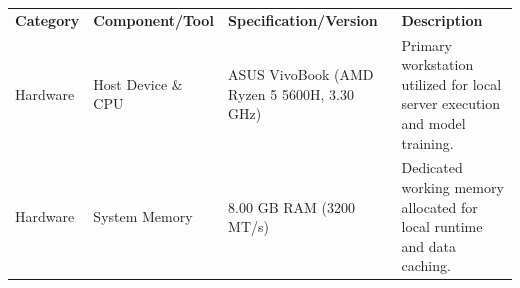 \documentclass[
]{article}
\newcounter{none} %
\begin{document}
{\def\LTcaptype{none} %
\begin{longtable}[]{@{}
  >{\raggedright\arraybackslash}p{}
  >{\raggedright\arraybackslash}p{}
  >{\raggedright\arraybackslash}p{}
  >{\raggedright\arraybackslash}p{}@{}}
\toprule\noalign{}
\begin{minipage}[b]{\linewidth}\raggedright
\textbf{Category}
\end{minipage} & \begin{minipage}[b]{\linewidth}\raggedright
\textbf{Component/Tool}
\end{minipage} & \begin{minipage}[b]{\linewidth}\raggedright
\textbf{Specification/Version}
\end{minipage} & \begin{minipage}[b]{\linewidth}\raggedright
\textbf{Description}
\end{minipage} \\
\begin{minipage}[b]{\linewidth}\raggedright
Hardware
\end{minipage} & \begin{minipage}[b]{\linewidth}\raggedright
Host Device \& CPU
\end{minipage} & \begin{minipage}[b]{\linewidth}\raggedright
ASUS VivoBook (AMD Ryzen 5 5600H, 3.30 GHz)
\end{minipage} & \begin{minipage}[b]{\linewidth}\raggedright
Primary workstation utilized for local server execution and model
training.
\end{minipage} \\
\begin{minipage}[b]{\linewidth}\raggedright
Hardware
\end{minipage} & \begin{minipage}[b]{\linewidth}\raggedright
System Memory
\end{minipage} & \begin{minipage}[b]{\linewidth}\raggedright
8.00 GB RAM (3200 MT/s)
\end{minipage} & \begin{minipage}[b]{\linewidth}\raggedright
Dedicated working memory allocated for local runtime and data caching.
\end{minipage} \\

\end{longtable}}
\end{document}
